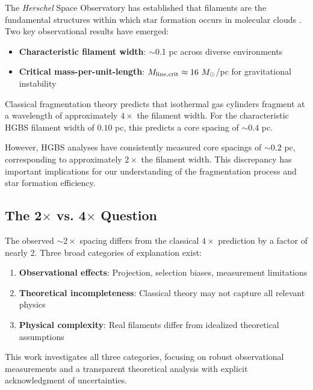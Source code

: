 \documentclass[11pt,a4paper]{article}
\begin{document}
The \textit{Herschel} Space Observatory has established that filaments are the fundamental structures within which star formation occurs in molecular clouds \citep{Andre2010}. Two key observational results have emerged:

\begin{itemize}
    \item \textbf{Characteristic filament width}: $\sim$0.1 pc across diverse environments \citep{Arzoumanian2011}
    \item \textbf{Critical mass-per-unit-length}: $M_{\rm line,crit} \approx 16~M_\odot$/pc for gravitational instability \citep{Ostriker1964}
\end{itemize}

Classical fragmentation theory \citep{Inutsuka1992} predicts that isothermal gas cylinders fragment at a wavelength of approximately $4\times$ the filament width. For the characteristic HGBS filament width of $0.10$ pc, this predicts a core spacing of $\sim0.4$ pc.

However, HGBS analyses have consistently measured core spacings of $\sim0.2$ pc, corresponding to approximately $2\times$ the filament width. This discrepancy has important implications for our understanding of the fragmentation process and star formation efficiency.

\subsection{The 2$\times$ vs. 4$\times$ Question}

The observed $\sim2\times$ spacing differs from the classical $4\times$ prediction by a factor of nearly 2. Three broad categories of explanation exist:

\begin{enumerate}
    \item \textbf{Observational effects}: Projection, selection biases, measurement limitations
    \item \textbf{Theoretical incompleteness}: Classical theory may not capture all relevant physics
    \item \textbf{Physical complexity}: Real filaments differ from idealized theoretical assumptions
\end{enumerate}

This work investigates all three categories, focusing on robust observational measurements and a transparent theoretical analysis with explicit acknowledgment of uncertainties.
\end{document}
